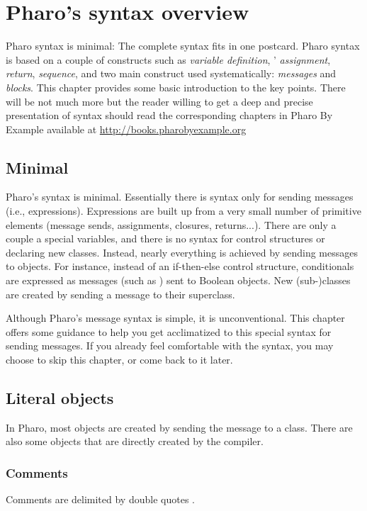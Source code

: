 \documentclass[10pt,twoside,english]{_support/latex/sbabook/sbabook}
\begin{document}
\frontmatter
\pagestyle{plain}

\tableofcontents*
\clearpage\listoffigures

\mainmatter

\chapter{Pharo's syntax overview}\label{cha:syntax}
Pharo syntax is minimal: The complete syntax fits in one postcard.
Pharo syntax is based on a couple of constructs such as \textit{variable definition}, ' \textit{assignment}, \textit{return}, \textit{sequence}, and two main construct used systematically: \textit{messages} and \textit{blocks}.  This chapter provides some basic introduction to the key points. There will be not much more but the reader willing to get a deep and precise presentation of syntax should read the corresponding chapters in Pharo By Example available at \url{http://books.pharobyexample.org}
\section{Minimal}
Pharo's syntax is minimal. Essentially there is syntax only for sending messages
(i.e., expressions). Expressions are built up from a very small number of
primitive elements (message sends, assignments, closures, returns...). There are
only a couple a special variables, and there is no syntax for control structures or declaring new
classes. Instead, nearly everything is achieved by sending messages to objects.
For instance, instead of an if-then-else control structure, conditionals are
expressed as messages (such as ) sent to Boolean objects. New
(sub-)classes are created by sending a message to their superclass.

Although Pharo's message syntax is simple, it is unconventional. This chapter offers some guidance to help you get
acclimatized to this special syntax for sending messages. If you already feel
comfortable with the syntax, you may choose to skip this chapter, or come back
to it later.
\section{Literal objects}
In Pharo, most objects are created by sending the message  to a class. There are also some objects that are directly created by the compiler. 
\subsection{Comments}
Comments are delimited by double quotes . 
\end{document}
